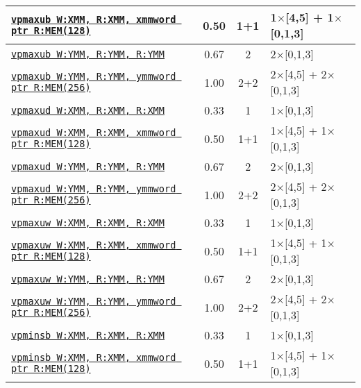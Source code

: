 \documentclass[a4paper,english,fontsize=9]{scrartcl}
\begin{document}
\begin{longtable}{p{}ccL{.25\textwidth}}
  \midrule
  \texttt{\href{https://felixcloutier.com/x86/PMAXUB:PMAXUW.html}{vpmaxub W:XMM, R:XMM, xmmword ptr R:MEM(128)}} & 0.50 & 1+1 & 1\(\times\)[4,5] + 1\(\times\)[0,1,3] \\
  \midrule
  \texttt{\href{https://felixcloutier.com/x86/PMAXUB:PMAXUW.html}{vpmaxub W:YMM, R:YMM, R:YMM}} & 0.67 & 2 & 2\(\times\)[0,1,3] \\
  \midrule
  \texttt{\href{https://felixcloutier.com/x86/PMAXUB:PMAXUW.html}{vpmaxub W:YMM, R:YMM, ymmword ptr R:MEM(256)}} & 1.00 & 2+2 & 2\(\times\)[4,5] + 2\(\times\)[0,1,3] \\
  \midrule
  \texttt{\href{https://felixcloutier.com/x86/PMAXUD:PMAXUQ.html}{vpmaxud W:XMM, R:XMM, R:XMM}} & 0.33 & 1 & 1\(\times\)[0,1,3] \\
  \midrule
  \texttt{\href{https://felixcloutier.com/x86/PMAXUD:PMAXUQ.html}{vpmaxud W:XMM, R:XMM, xmmword ptr R:MEM(128)}} & 0.50 & 1+1 & 1\(\times\)[4,5] + 1\(\times\)[0,1,3] \\
  \midrule
  \texttt{\href{https://felixcloutier.com/x86/PMAXUD:PMAXUQ.html}{vpmaxud W:YMM, R:YMM, R:YMM}} & 0.67 & 2 & 2\(\times\)[0,1,3] \\
  \midrule
  \texttt{\href{https://felixcloutier.com/x86/PMAXUD:PMAXUQ.html}{vpmaxud W:YMM, R:YMM, ymmword ptr R:MEM(256)}} & 1.00 & 2+2 & 2\(\times\)[4,5] + 2\(\times\)[0,1,3] \\
  \midrule
  \texttt{\href{https://felixcloutier.com/x86/PMAXUB:PMAXUW.html}{vpmaxuw W:XMM, R:XMM, R:XMM}} & 0.33 & 1 & 1\(\times\)[0,1,3] \\
  \midrule
  \texttt{\href{https://felixcloutier.com/x86/PMAXUB:PMAXUW.html}{vpmaxuw W:XMM, R:XMM, xmmword ptr R:MEM(128)}} & 0.50 & 1+1 & 1\(\times\)[4,5] + 1\(\times\)[0,1,3] \\
  \midrule
  \texttt{\href{https://felixcloutier.com/x86/PMAXUB:PMAXUW.html}{vpmaxuw W:YMM, R:YMM, R:YMM}} & 0.67 & 2 & 2\(\times\)[0,1,3] \\
  \midrule
  \texttt{\href{https://felixcloutier.com/x86/PMAXUB:PMAXUW.html}{vpmaxuw W:YMM, R:YMM, ymmword ptr R:MEM(256)}} & 1.00 & 2+2 & 2\(\times\)[4,5] + 2\(\times\)[0,1,3] \\
  \midrule
  \texttt{\href{https://felixcloutier.com/x86/PMINSB:PMINSW.html}{vpminsb W:XMM, R:XMM, R:XMM}} & 0.33 & 1 & 1\(\times\)[0,1,3] \\
  \midrule
  \texttt{\href{https://felixcloutier.com/x86/PMINSB:PMINSW.html}{vpminsb W:XMM, R:XMM, xmmword ptr R:MEM(128)}} & 0.50 & 1+1 & 1\(\times\)[4,5] + 1\(\times\)[0,1,3] \\

\end{longtable}
\end{document}

